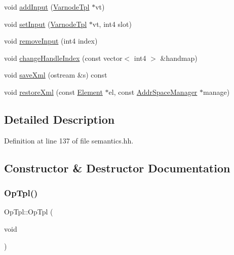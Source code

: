 \begin{DoxyCompactItemize}
void \mbox{\hyperlink{class_op_tpl_a59a7f870a779794d1ea68caab003c62d}{add\+Input}} (\mbox{\hyperlink{class_varnode_tpl}{Varnode\+Tpl}} $\ast$vt)
\item 
void \mbox{\hyperlink{class_op_tpl_ae9701a473231fa04ede55b6a184c06ff}{set\+Input}} (\mbox{\hyperlink{class_varnode_tpl}{Varnode\+Tpl}} $\ast$vt, int4 slot)
\item 
void \mbox{\hyperlink{class_op_tpl_aeb61240e9ee070a3f8f87cd15a39aee6}{remove\+Input}} (int4 index)
\item 
void \mbox{\hyperlink{class_op_tpl_a302870e8758b00eee4237324a6d089fa}{change\+Handle\+Index}} (const vector$<$ int4 $>$ \&handmap)
\item 
void \mbox{\hyperlink{class_op_tpl_aa35283135fb5864ff5b493d8d8886401}{save\+Xml}} (ostream \&s) const
\item 
void \mbox{\hyperlink{class_op_tpl_a538b7121bcb439945a4f0b8b1f03f3a2}{restore\+Xml}} (const \mbox{\hyperlink{class_element}{Element}} $\ast$el, const \mbox{\hyperlink{class_addr_space_manager}{Addr\+Space\+Manager}} $\ast$manage)
\end{DoxyCompactItemize}


\subsection{Detailed Description}


Definition at line 137 of file semantics.\+hh.



\subsection{Constructor \& Destructor Documentation}
\mbox{\label{class_op_tpl_a7f94edad0bde40456f2b7a45290310df}} 
\subsubsection{\texorpdfstring{OpTpl()}{OpTpl()}\hspace{0.1cm}{\footnotesize\ttfamily [1/2]}}
{\footnotesize\ttfamily Op\+Tpl\+::\+Op\+Tpl (\begin{DoxyParamCaption}\item[{void}]{ }\end{DoxyParamCaption})\hspace{0.3cm}{\ttfamily [inline]}}



